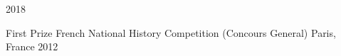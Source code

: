 



\begin{cvhonors}

	{2018} %

	\cvhonor
	{First Prize} %
	{French National History Competition (Concours General)} %
	{Paris, France} %
	{2012} %

\end{cvhonors}




